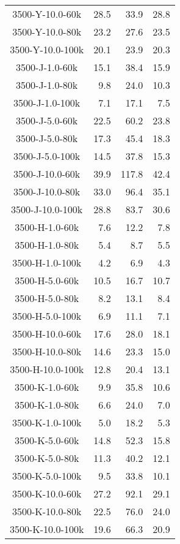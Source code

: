 \begin{longtable}{crrr}
    3500-Y-10.0-60k &  28.5 &   33.9 &  28.8 \\
    3500-Y-10.0-80k &  23.2 &   27.6 &  23.5 \\
    3500-Y-10.0-100k &  20.1 &   23.9 &  20.3 \\
    3500-J-1.0-60k &  15.1 &   38.4 &  15.9 \\
    3500-J-1.0-80k &   9.8 &   24.0 &  10.3 \\
    3500-J-1.0-100k &   7.1 &   17.1 &   7.5 \\
    3500-J-5.0-60k &  22.5 &   60.2 &  23.8 \\
    3500-J-5.0-80k &  17.3 &   45.4 &  18.3 \\
    3500-J-5.0-100k &  14.5 &   37.8 &  15.3 \\
    3500-J-10.0-60k &  39.9 &  117.8 &  42.4 \\
    3500-J-10.0-80k &  33.0 &   96.4 &  35.1 \\
    3500-J-10.0-100k &  28.8 &   83.7 &  30.6 \\
    3500-H-1.0-60k &   7.6 &   12.2 &   7.8 \\
    3500-H-1.0-80k &   5.4 &    8.7 &   5.5 \\
    3500-H-1.0-100k &   4.2 &    6.9 &   4.3 \\
    3500-H-5.0-60k &  10.5 &   16.7 &  10.7 \\
    3500-H-5.0-80k &   8.2 &   13.1 &   8.4 \\
    3500-H-5.0-100k &   6.9 &   11.1 &   7.1 \\
    3500-H-10.0-60k &  17.6 &   28.0 &  18.1 \\
    3500-H-10.0-80k &  14.6 &   23.3 &  15.0 \\
    3500-H-10.0-100k &  12.8 &   20.4 &  13.1 \\
    3500-K-1.0-60k &   9.9 &   35.8 &  10.6 \\
    3500-K-1.0-80k &   6.6 &   24.0 &   7.0 \\
    3500-K-1.0-100k &   5.0 &   18.2 &   5.3 \\
    3500-K-5.0-60k &  14.8 &   52.3 &  15.8 \\
    3500-K-5.0-80k &  11.3 &   40.2 &  12.1 \\
    3500-K-5.0-100k &   9.5 &   33.8 &  10.1 \\
    3500-K-10.0-60k &  27.2 &   92.1 &  29.1 \\
    3500-K-10.0-80k &  22.5 &   76.0 &  24.0 \\
    3500-K-10.0-100k &  19.6 &   66.3 &  20.9 \\

\end{longtable}
